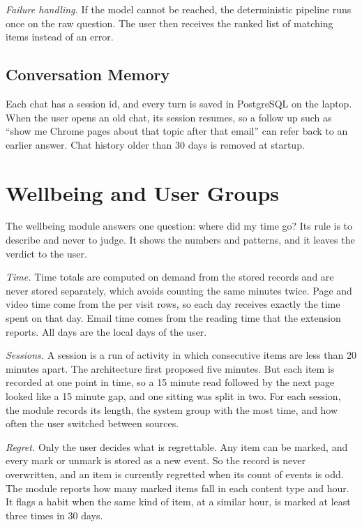 \documentclass[conference]{IEEEtran}
\begin{document}
\textit{Failure handling.} If the model cannot be reached, the deterministic pipeline runs once on the raw question. The user then receives the ranked list of matching items instead of an error.

\subsection{Conversation Memory}
Each chat has a session id, and every turn is saved in PostgreSQL on the laptop. When the user opens an old chat, its session resumes, so a follow up such as ``show me Chrome pages about that topic after that email'' can refer back to an earlier answer. Chat history older than 30 days is removed at startup.

\section{Wellbeing and User Groups}\label{sec:wba}
The wellbeing module answers one question: where did my time go? Its rule is to describe and never to judge. It shows the numbers and patterns, and it leaves the verdict to the user.

\textit{Time.} Time totals are computed on demand from the stored records and are never stored separately, which avoids counting the same minutes twice. Page and video time come from the per visit rows, so each day receives exactly the time spent on that day. Email time comes from the reading time that the extension reports. All days are the local days of the user.

\textit{Sessions.} A session is a run of activity in which consecutive items are less than 20 minutes apart. The architecture first proposed five minutes. But each item is recorded at one point in time, so a 15 minute read followed by the next page looked like a 15 minute gap, and one sitting was split in two. For each session, the module records its length, the system group with the most time, and how often the user switched between sources.

\textit{Regret.} Only the user decides what is regrettable. Any item can be marked, and every mark or unmark is stored as a new event. So the record is never overwritten, and an item is currently regretted when its count of events is odd. The module reports how many marked items fall in each content type and hour. It flags a habit when the same kind of item, at a similar hour, is marked at least three times in 30 days.
\end{document}
